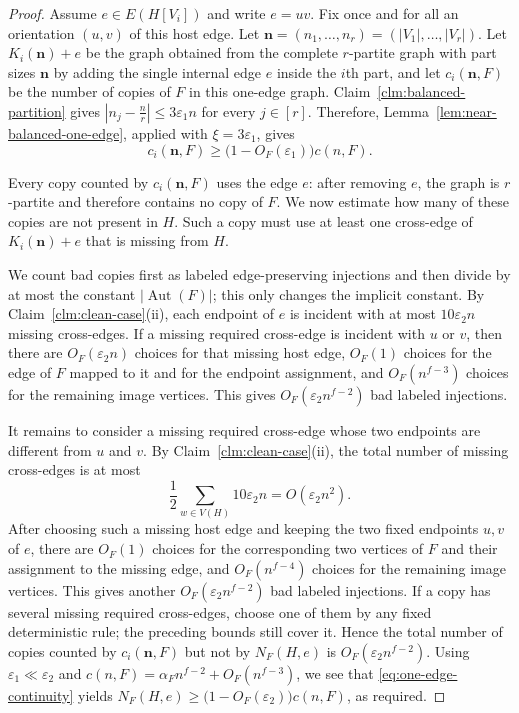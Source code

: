 \documentclass[11pt,a4paper]{article}
\theoremstyle{definition}
\theoremstyle{plain}
\newcommand{\Aut}{\operatorname{Aut}}
\newcommand{\eps}{\varepsilon}
\renewcommand{\le}{\leqslant}
\renewcommand{\ge}{\geqslant}
\begin{document}
\begin{proof}
Assume $e\in E(H[V_i])$ and write $e=uv$.  Fix once and for all an orientation $(u,v)$ of this host edge.  Let
$  \mathbf n=(n_1,\ldots,n_r)=(|V_1|,\ldots,|V_r|)$. 
Let $K_i(\mathbf n)+e$ be the graph obtained from the complete $r$-partite graph with part sizes $\mathbf n$ by adding the single internal edge $e$ inside the $i$th part, and let $c_i(\mathbf n,F)$ be the number of copies of $F$ in this one-edge graph.  Claim~\ref{clm:balanced-partition} gives 
$ \left|n_j-\frac nr\right|\le 3\eps_1n$ for every $j\in [r]$. 
Therefore, Lemma~\ref{lem:near-balanced-one-edge}, applied with $\xi=3\eps_1$, gives
\begin{equation}\label{eq:one-edge-continuity}
  c_i(\mathbf n,F)
  \ge \big(1-O_F(\eps_1)\big)c(n,F).
\end{equation}

Every copy counted by $c_i(\mathbf n,F)$ uses the edge $e$: after removing $e$, the graph is $r$-partite and therefore contains no copy of $F$.  We now estimate how many of these copies are not present in $H$.  Such a copy must use at least one cross-edge of $K_i(\mathbf n)+e$ that is missing from $H$.

We count bad copies first as labeled edge-preserving injections and then divide by at most the constant $|\Aut(F)|$; this only changes the implicit constant.  By Claim~\ref{clm:clean-case}(ii), each endpoint of $e$ is incident with at most $10\eps_2n$ missing cross-edges.  If a missing required cross-edge is incident with $u$ or $v$, then there are $O_F(\eps_2n)$ choices for that missing host edge, $O_F(1)$ choices for the edge of $F$ mapped to it and for the endpoint assignment, and $O_F(n^{f-3})$ choices for the remaining image vertices.  This gives $O_F(\eps_2n^{f-2})$ bad labeled injections.

It remains to consider a missing required cross-edge whose two endpoints are different from $u$ and $v$.  By Claim~\ref{clm:clean-case}(ii), the total number of missing cross-edges is at most
\[
  \frac12\sum_{w\in V(H)}10\eps_2n=O(\eps_2n^2).
\]
After choosing such a missing host edge and keeping the two fixed endpoints $u,v$ of $e$, there are $O_F(1)$ choices for the corresponding two vertices of $F$ and their assignment to the missing edge, and $O_F(n^{f-4})$ choices for the remaining image vertices.  This gives another $O_F(\eps_2n^{f-2})$ bad labeled injections.  If a copy has several missing required cross-edges, choose one of them by any fixed deterministic rule; the preceding bounds still cover it.  Hence the total number of copies counted by $c_i(\mathbf n,F)$ but not by $N_F(H,e)$ is
$
  O_F(\eps_2n^{f-2})$. 
Using $\eps_1\ll\eps_2$ and $c(n,F)=\alpha_Fn^{f-2}+O_F(n^{f-3})$, 
we see that \eqref{eq:one-edge-continuity} yields
$N_F(H,e)
  \ge \big(1-O_F(\eps_2) \big)c(n,F)$, 
as required.
\end{proof}
\end{document}
